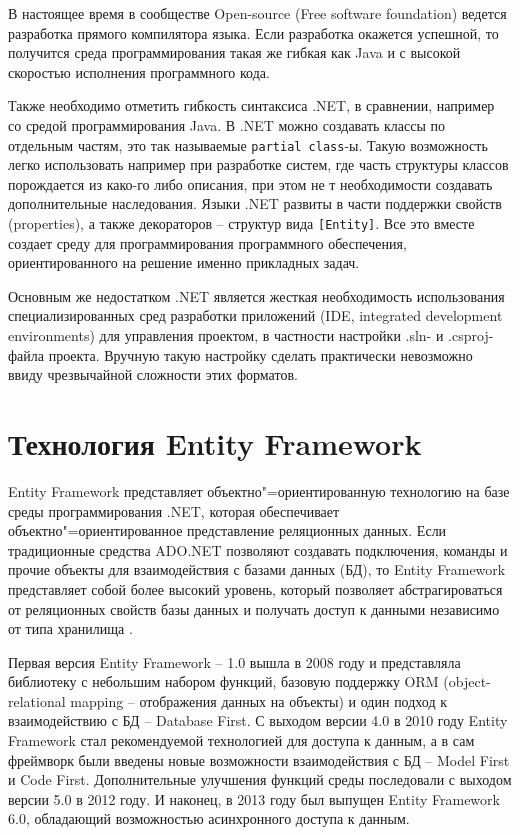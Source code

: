 \documentclass[a4paper,14pt,openany,final]{extreport} %
\begin{document}
В настоящее время в сообществе Open-source (\foreignlanguage{english}{Free software foundation}) ведется разработка прямого компилятора языка. Если разработка окажется успешной, то получится среда программирования такая же гибкая как Java и с высокой скоростью исполнения программного кода.

Также необходимо отметить гибкость синтаксиса .NET, в сравнении, например со средой программирования Java. В .NET можно создавать классы по отдельным частям, это так называемые \verb|partial class|-ы. Такую возможность легко использовать например при разработке систем, где часть структуры классов порождается из како-го либо описания, при этом не т необходимости создавать дополнительные наследования. Языки .NET развиты в части поддержки свойств (properties), а также декораторов -- структур вида \verb|[Entity]|. Все это вместе создает среду для программирования программного обеспечения, ориентированного на решение именно прикладных задач.

Основным же недостатком .NET является жесткая необходимость использования специализированных сред разработки приложений (IDE, integrated development environments) для управления проектом, в частности настройки .sln- и .csproj-файла проекта. Вручную такую настройку сделать практически невозможно ввиду чрезвычайной сложности этих форматов.

\section{Технология Entity Framework}

Entity Framework представляет объектно"=ориентированную технологию на базе среды программирования .NET, которая обеспечивает объектно"=ориентированное представление реляционных данных. Если традиционные средства ADO.NET позволяют создавать подключения, команды и прочие объекты для взаимодействия с базами данных (БД), то Entity Framework представляет собой более высокий уровень, который позволяет абстрагироваться от реляционных свойств базы данных и получать доступ к данными независимо от типа хранилища \cite{entityframework}.

Первая версия Entity Framework -- 1.0 вышла в 2008 году и представляла библиотеку с небольшим набором функций, базовую поддержку ORM (object-relational mapping -- отображения данных на объекты) и один подход к взаимодействию с БД -- Database First. С выходом версии 4.0 в 2010 году Entity Framework стал рекомендуемой технологией для доступа к данным, а в сам фреймворк были введены новые возможности взаимодействия с БД -- Model First и Code First. Дополнительные улучшения функций среды последовали с выходом версии 5.0 в 2012 году. И наконец, в 2013 году был выпущен Entity Framework 6.0, обладающий возможностью асинхронного доступа к данным.
\end{document}
